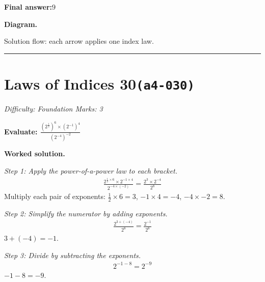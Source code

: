 \documentclass[11pt]{article}
\newcommand{\question}[1]{\par\medskip\noindent\textbf{#1}\par}
\begin{document}
\begin{answerbox}
\textbf{Final answer:}\quad \(\displaystyle 9\)
\end{answerbox}
\textbf{Diagram.}

\begin{center}
\end{center}
\small Solution flow: each arrow applies one index law.\normalsize

\medskip\hrule

\section*{Laws of Indices 30\quad\small\texttt{(a4-030)}}
\textit{Difficulty: Foundation \quad\textbar\quad Marks: 3}

\question{Evaluate: \( \frac{(2^{\frac{1}{2}})^6 \times (2^{-1})^4}{(2^{-4})^{-2}} \)}

\textbf{Worked solution.}

\textit{Step 1: Apply the power-of-a-power law to each bracket.}
\[\begin{gathered}
\frac{2^{\frac{1}{2} \times 6} \times 2^{-1 \times 4}}{2^{-4 \times (-2)}} = \frac{2^3 \times 2^{-4}}{2^8}
\end{gathered}\]
Multiply each pair of exponents: \( \frac{1}{2} \times 6 = 3 \), \( -1 \times 4 = -4 \), \( -4 \times -2 = 8 \).

\textit{Step 2: Simplify the numerator by adding exponents.}
\[\begin{gathered}
\frac{2^{3+(-4)}}{2^8} = \frac{2^{-1}}{2^8}
\end{gathered}\]
\( 3 + (-4) = -1 \).

\textit{Step 3: Divide by subtracting the exponents.}
\[\begin{gathered}
2^{-1-8} = 2^{-9}
\end{gathered}\]
\( -1 - 8 = -9 \).
\end{document}
